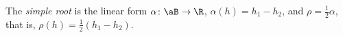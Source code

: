 The \emph{simple root} is the linear form $\alpha\colon\aB\to\R$, $\alpha(h)=h_1-h_2$, and $\rho=\frac12\alpha$, that is,
$\rho(h)=\frac12(h_1-h_2)$.
